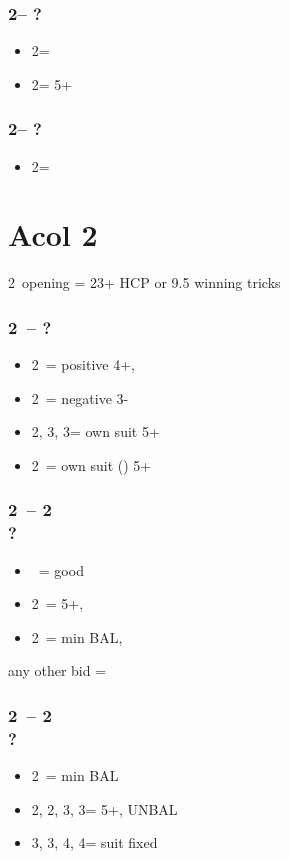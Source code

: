 \subsubsection*{2\hearts -- ?}
\begin{itemize}
    \item 2\spades = \lsf
    \item 2\nt = 5+\spades
\end{itemize}

\subsubsection*{2\spades -- ?}
\begin{itemize}
    \item 2\nt = \lsf
\end{itemize}

\section{\texorpdfstring{Acol 2{\color{OliveGreen}\clubsuit}}{acol2c}}\label{sec:acol2c}

2\clubs\ opening = 23+ HCP or 9.5 winning tricks

\subsubsection*{2\clubs\ -- ?}
\begin{itemize}
    \item 2\diams\ = positive 4+, \gf
    \item 2\hearts\ = negative 3-
    \item 2\spades, 3\clubs, 3\diams = own suit 5+
    \item 2\nt\ = own suit (\hearts) 5+
\end{itemize}

\subsubsection*{2\clubs\ -- 2\hearts \\ ?}
\begin{itemize}
    \item \pass\ = good \hearts
    \item 2\spades\ = 5+, \fonce
    \item 2\nt\ = min BAL, \nf
\end{itemize}

any other bid = \gf

\subsubsection*{2\clubs\ -- 2\diams \\ ?}
\begin{itemize}
    \item 2\nt\ = min BAL
    \item 2\hearts, 2\spades, 3\clubs, 3\diams = 5+, UNBAL
    \item 3\hearts, 3\spades, 4\clubs, 4\diams = suit fixed
\end{itemize}

